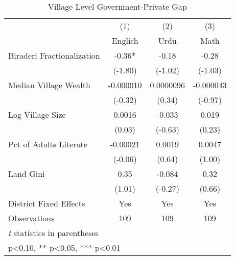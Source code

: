 \begin{table}[htbp]\centering
\def\sym#1{\ifmmode^{#1}\else\(^{#1}\)\fi}
\caption{Village Level Government-Private Gap\label{villagegap}}
\begin{tabular}{l*{3}{c}}
\toprule
                &\multicolumn{1}{c}{(1)}&\multicolumn{1}{c}{(2)}&\multicolumn{1}{c}{(3)}\\
                &\multicolumn{1}{c}{English}&\multicolumn{1}{c}{Urdu}&\multicolumn{1}{c}{Math}\\
\midrule
Biraderi Fractionalization&    -0.36*  &    -0.18   &    -0.28   \\
                &  (-1.80)   &  (-1.02)   &  (-1.03)   \\
Median Village Wealth&-0.000010   &0.0000096   &-0.000043   \\
                &  (-0.32)   &   (0.34)   &  (-0.97)   \\
Log Village Size&   0.0016   &   -0.033   &    0.019   \\
                &   (0.03)   &  (-0.63)   &   (0.23)   \\
Pct of Adults Literate& -0.00021   &   0.0019   &   0.0047   \\
                &  (-0.06)   &   (0.64)   &   (1.00)   \\
Land Gini       &     0.35   &   -0.084   &     0.32   \\
                &   (1.01)   &  (-0.27)   &   (0.66)   \\
District Fixed Effects&      Yes   &      Yes   &      Yes   \\
\midrule
Observations    &      109   &      109   &      109   \\
\bottomrule
\multicolumn{4}{l}{\footnotesize \textit{t} statistics in parentheses}\\
\multicolumn{4}{l}{\footnotesize * p<0.10, ** p<0.05, *** p<0.01}\\
\end{tabular}
\end{table}
